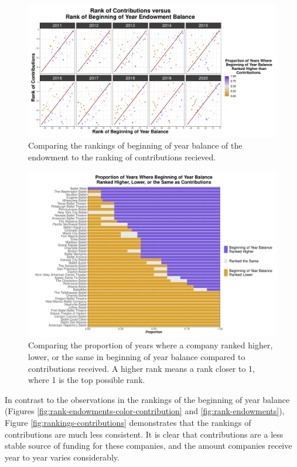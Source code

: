 \documentclass[Dance Data
Project,article,submit,moreauthors,pdftex]{mdpi}
\begin{document}
\begin{figure}[H]
\includegraphics[width=0.75\linewidth,]{../images/compare-rankings-balance-contributions} \caption{\label{fig:balancecont} Comparing the rankings of beginning of year balance of the endowment to the ranking of contributions recieved.}\label{fig:compare-rankings-balance-contributions}
\end{figure}

\begin{figure}[H]
\includegraphics[width=0.75\linewidth,]{../images/compare-rankings-balance-contributions-barplot} \caption{\label{fig:balancecontbar} Comparing the proportion of years where a company ranked higher, lower, or the same in beginning of year balance compared to contributions received. A higher rank means a rank closer to 1, where 1 is the top possible rank.}\label{fig:compare-rankings-balance-contributions-barplot}
\end{figure}

In contrast to the observations in the rankings of the beginning of year
balance (Figures \ref{fig:rank-endowments-color-contribution} and
\ref{fig:rank-endowments}), Figure \ref{fig:rankings-contributions}
demonstrates that the rankings of contributions are much less
consistent. It is clear that contributions are a less stable source of
funding for these companies, and the amount companies receive year to
year varies considerably.
\end{document}
